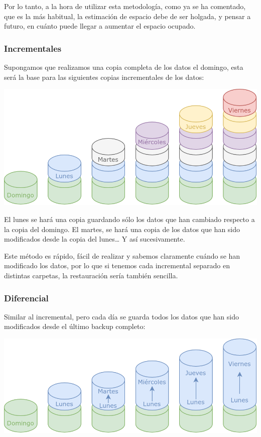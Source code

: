Por lo tanto, a la hora de utilizar esta metodología, como ya se ha comentado, que es la más habitual, la estimación de espacio debe de ser holgada, y pensar a futuro, en cuánto puede llegar a aumentar el espacio ocupado.

\subsubsection{Incrementales}
﻿Supongamos que realizamos una copia completa de los datos el domingo, esta será la base para las siguientes copias incrementales de los datos:

\begin{center}
    \vspace{-10pt}
    \includegraphics[width=0.7\linewidth]{incremental.png}
    \vspace{-20pt}
\end{center}

El lunes se hará una copia guardando sólo los datos que han cambiado respecto a la copia del domingo. El martes, se hará una copia de los datos que han sido modificados desde la copia del lunes… Y así sucesivamente.

Este método es rápido, fácil de realizar y sabemos claramente cuándo se han modificado los datos, por lo que si tenemos cada incremental separado en distintas carpetas, la restauración sería también sencilla.

\subsubsection{Diferencial}
Similar al incremental, pero cada día se guarda todos los datos que han sido modificados desde el último backup completo:

\begin{center}
    \vspace{-10pt}
    \includegraphics[width=0.7\linewidth]{diferencial.png}
    \vspace{-20pt}
\end{center}

